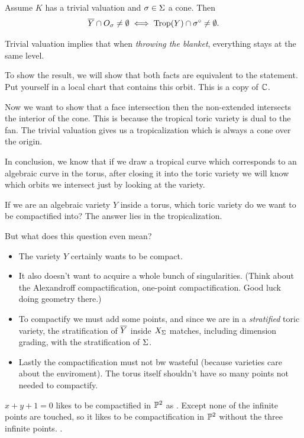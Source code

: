 \documentclass[12pt]{memoir}
\DeclareMathOperator{\Trop}{Trop}
\theoremstyle{definition}
\begin{document}
\begin{Th}
Assume $K$ has a trivial valuation and $\sigma\in\Sigma$ a cone. Then 
$$\ov Y\cap O_\sg\neq\emptyset\iff \Trop(Y)\cap\sg^\circ\neq\emptyset.$$
\end{Th}

\begin{Rmk}
Trivial valuation implies that when \emph{throwing the blanket}, everything stays at the same level.
\end{Rmk}

\begin{ptcbp}
To show the result, we will show that both facts are equivalent to the statement.  Put yourself in a local chart that contains this orbit. This is a copy of $\mathbb{C}$.\par 
Now we want to show that a face intersection then the non-extended intersects the interior of the cone. This is because the tropical toric variety is dual to the fan. The trivial valuation gives us a tropicalization which is always a cone over the origin. 
\end{ptcbp}

In conclusion, we know that if we draw a tropical curve which corresponds to an algebraic curve in the torus, after closing it into the toric variety we will know which orbits we intersect just by looking at the variety.\par 
If we are an algebraic variety $Y$ inside a torus, which toric variety do we want to be compactified into? The answer lies in the tropicalization.\par 
But what does this question even mean? 
\begin{itemize}
    \item The variety $Y$ certainly wants to be compact.
    \item It also doesn't want to acquire a whole bunch of singularities. (Think about the Alexandroff compactification, one-point compactification. Good luck doing geometry there.)
    \item To compactify we must add some points, and since we are in a \emph{stratified} toric variety, the stratification of $\overline Y$ inside $X_\Sigma$ matches, including dimension grading, with the stratification of $\Sigma$. 
    \item Lastly the compactification must not bw wasteful (because varieties care about the enviroment). The torus itself shouldn't have so many points not needed to compactify.
\end{itemize}
$x+y+1=0$ likes to be compactified in $\mathbb{P}^2$ as . Except none of the infinite points are touched, so it likes to be compactification in $\mathbb{P}^2$ without the three infinite points. .
\end{document}
